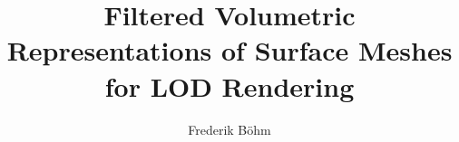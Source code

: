 \documentclass[11pt, twoside, openright, a4paper]{studdipl}
\title{Filtered Volumetric Representations of Surface Meshes for LOD Rendering}
\author{Frederik Böhm}
\begin{document}
\draft

\prepages

\maketitle

\cleardoublepage

\tableofcontents



\cleardoublepage

\mainbody


 

 


\begin{appendix}
	
\end{appendix}


\listoffigures


\printbibliography

\end{document}
